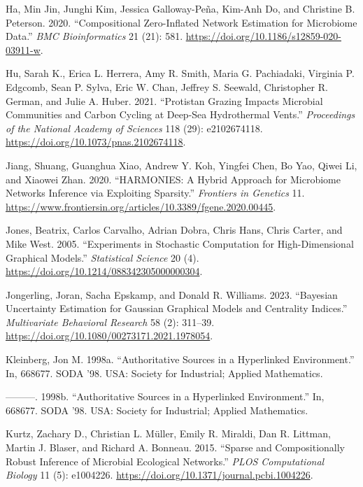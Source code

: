 \documentclass[
  a4paper,
]{article}
\newlength{\cslhangindent}
\newlength{\cslentryspacingunit} %
\newenvironment{CSLReferences}[2] %
 {%
  \setlength{\parindent}{0pt}
  \ifodd #1
  \let\oldpar\par
  \def\par{\hangindent=\cslhangindent\oldpar}
  \fi
  \setlength{\parskip}{#2\cslentryspacingunit}
 }%
 {}
\begin{document}
\begin{CSLReferences}{1}{0}
\leavevmode{}%
Ha, Min Jin, Junghi Kim, Jessica Galloway-Peña, Kim-Anh Do, and
Christine B. Peterson. 2020. {``Compositional Zero-Inflated Network
Estimation for Microbiome Data.''} \emph{BMC Bioinformatics} 21 (21):
581. \url{https://doi.org/10.1186/s12859-020-03911-w}.

\leavevmode{}%
Hu, Sarah K., Erica L. Herrera, Amy R. Smith, Maria G. Pachiadaki,
Virginia P. Edgcomb, Sean P. Sylva, Eric W. Chan, Jeffrey S. Seewald,
Christopher R. German, and Julie A. Huber. 2021. {``Protistan Grazing
Impacts Microbial Communities and Carbon Cycling at Deep-Sea
Hydrothermal Vents.''} \emph{Proceedings of the National Academy of
Sciences} 118 (29): e2102674118.
\url{https://doi.org/10.1073/pnas.2102674118}.

\leavevmode{}%
Jiang, Shuang, Guanghua Xiao, Andrew Y. Koh, Yingfei Chen, Bo Yao, Qiwei
Li, and Xiaowei Zhan. 2020. {``HARMONIES: A Hybrid Approach for
Microbiome Networks Inference via Exploiting Sparsity.''}
\emph{Frontiers in Genetics} 11.
\url{https://www.frontiersin.org/articles/10.3389/fgene.2020.00445}.

\leavevmode{}%
Jones, Beatrix, Carlos Carvalho, Adrian Dobra, Chris Hans, Chris Carter,
and Mike West. 2005. {``Experiments in Stochastic Computation for
High-Dimensional Graphical Models.''} \emph{Statistical Science} 20 (4).
\url{https://doi.org/10.1214/088342305000000304}.

\leavevmode{}%
Jongerling, Joran, Sacha Epskamp, and Donald R. Williams. 2023.
{``Bayesian Uncertainty Estimation for Gaussian Graphical Models and
Centrality Indices.''} \emph{Multivariate Behavioral Research} 58 (2):
311--39. \url{https://doi.org/10.1080/00273171.2021.1978054}.

\leavevmode{}%
Kleinberg, Jon M. 1998a. {``Authoritative Sources in a Hyperlinked
Environment.''} In, 668677. SODA '98. USA: Society for Industrial;
Applied Mathematics.

\leavevmode{}%
---------. 1998b. {``Authoritative Sources in a Hyperlinked
Environment.''} In, 668677. SODA '98. USA: Society for Industrial;
Applied Mathematics.

\leavevmode{}%
Kurtz, Zachary D., Christian L. Müller, Emily R. Miraldi, Dan R.
Littman, Martin J. Blaser, and Richard A. Bonneau. 2015. {``Sparse and
Compositionally Robust Inference of Microbial Ecological Networks.''}
\emph{PLOS Computational Biology} 11 (5): e1004226.
\url{https://doi.org/10.1371/journal.pcbi.1004226}.


\end{CSLReferences}
\end{document}
